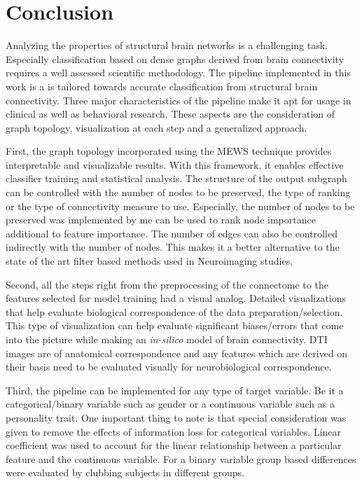 \documentclass[msthesis.tex]{subfiles}
\begin{document}
\chapter{Conclusion}
\iffalse
Interpretability-accuracy tradeoff. 
With the solver - 42 features (10 nodes)
with the baseline - much more number of nodes for the same features.
\fi
Analyzing the properties of structural brain networks is a challenging task. Especially classification based on dense graphs derived from brain connectivity requires a well assessed scientific methodology. The pipeline implemented in this work is a is tailored towards accurate classification from structural brain connectivity. Three major characteristics of the pipeline make it apt for usage in clinical as well as behavioral research. These aspects are the consideration of graph topology, visualization at each step and a generalized approach. 

First, the graph topology incorporated using the MEWS technique provides interpretable and visualizable results. With this framework, it enables effective classifier training and statistical analysis. The structure of the output subgraph can be controlled with the number of nodes to be preserved, the type of ranking or the type of connectivity measure to use. Especially, the number of nodes to be preserved was implemented by me can be used to rank node importance additional to feature importance. The number of edges can also be controlled indirectly with the number of nodes. This makes it a better alternative to the state of the art filter based methods used in Neuroimaging studies. 

Second, all the steps right from the preprocessing of the connectome to the features selected for model training had a visual analog. Detailed visualizations that help evaluate biological correspondence of the data preparation/selection. This type of visualization can help evaluate significant biases/errors that come into the picture while making an \textit{in-silico} model of brain connectivity. DTI images are of anatomical correspondence and any features which are derived on their basis need to be evaluated visually for neurobiological correspondence. 

Third, the pipeline can be implemented for any type of target variable. Be it a categorical/binary variable such as gender or a continuous variable such as a personality trait. One important thing to note is that special consideration was given to remove the effects of information loss for categorical variables. Linear coefficient was used to account for the linear relationship between a particular feature and the continuous variable. For a binary variable group based differences were evaluated by clubbing subjects in different groups. 
\end{document}
